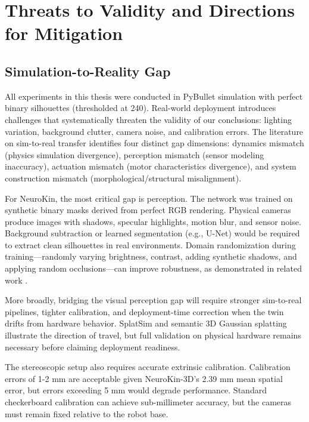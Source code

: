 \documentclass[12pt,a4paper,oneside]{report}
\begin{document}
\section{Threats to Validity and Directions for Mitigation}

\subsection{Simulation-to-Reality Gap}

All experiments in this thesis were conducted in PyBullet simulation with perfect binary silhouettes (thresholded at 240). Real-world deployment introduces challenges that systematically threaten the validity of our conclusions: lighting variation, background clutter, camera noise, and calibration errors. The literature on sim-to-real transfer \cite{tan2018simtoreal, aljalbout2026realitygap} identifies four distinct gap dimensions: dynamics mismatch (physics simulation divergence), perception mismatch (sensor modeling inaccuracy), actuation mismatch (motor characteristics divergence), and system construction mismatch (morphological/structural misalignment).

For NeuroKin, the most critical gap is perception. The network was trained on synthetic binary masks derived from perfect RGB rendering. Physical cameras produce images with shadows, specular highlights, motion blur, and sensor noise. Background subtraction or learned segmentation (e.g., U-Net) would be required to extract clean silhouettes in real environments. Domain randomization during training---randomly varying brightness, contrast, adding synthetic shadows, and applying random occlusions---can improve robustness, as demonstrated in related work \cite{rezvani2024robust, qiu2024swim2real}.

More broadly, bridging the visual perception gap will require stronger sim-to-real pipelines, tighter calibration, and deployment-time correction when the twin drifts from hardware behavior. SplatSim \cite{qureshi2025splatsim} and semantic 3D Gaussian splatting \cite{tang2025semantic} illustrate the direction of travel, but full validation on physical hardware remains necessary before claiming deployment readiness.

The stereoscopic setup also requires accurate extrinsic calibration. Calibration errors of 1-2 mm are acceptable given NeuroKin-3D's 2.39 mm mean spatial error, but errors exceeding 5 mm would degrade performance. Standard checkerboard calibration can achieve sub-millimeter accuracy, but the cameras must remain fixed relative to the robot base.
\end{document}
